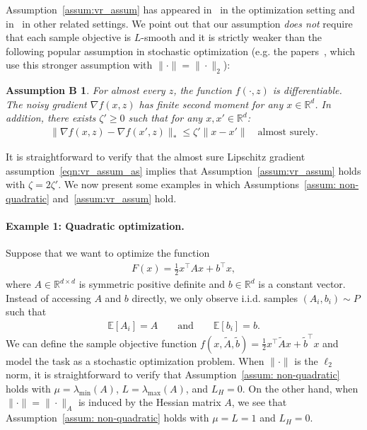\documentclass[11pt,twoside]{article}
\numberwithin{equation}{section}
\newcommand{\EE}{\mathbb{E}}
\newcommand{\RR}{\mathbb{R}}
\newcommand{\1}{\mathbf{1}}
\theoremstyle{remark}
\theoremstyle{plain}
\newtheorem*{assumptionBprime}{\textbf{Assumption B\textquotesingle}}
\newcommand{\liph}{L_H}
\begin{document}
Assumption~\ref{assum:vr_assum} has appeared in~\cite{li2022root} in the optimization setting and in~\cite{mou2023optimal,li2023accelerated} in other related settings. We point out that our assumption \emph{does not} require that each sample objective is $L$-smooth and it is strictly weaker than the following popular assumption in stochastic optimization (e.g. the papers~\cite{moulines2011non, needell2014stochastic, frostig2015competing, nguyen2019new,khamaru2024stochastic}, which use this stronger assumption with $\| \cdot \| = \| \cdot \|_2$):
\begin{assumptionBprime}\label{assum:vr_assum_standard} 
	For almost every $z$, the function $f(\cdot, z)$ is differentiable.   The noisy gradient $\nabla f(x,z)$ has finite second moment for any $x \in \RR^d$.  In addition, there exists $\zeta' \ge 0$ such that 
	for any $x, x' \in \RR^d$:
	\begin{align}\label{eqn:vr_assum_as}
		\|\nabla f(x,z)  -\nabla f(x',z)\|_* \le \zeta' \|x - x'\| \quad \text{almost surely.}
	\end{align} 
\end{assumptionBprime}
It is straightforward to verify that the almost sure Lipschitz gradient assumption~\eqref{eqn:vr_assum_as} implies that Assumption~\ref{assum:vr_assum} holds with $\zeta = 2\zeta'$. 
We now present some examples in which Assumptions~\ref{assum: non-quadratic} and~\ref{assum:vr_assum} hold.


\paragraph{Example 1: Quadratic optimization.}
Suppose that we want to optimize the function 
\begin{align*}
	F(x) = \frac{1}{2} x^\top A x + b^\top x,
\end{align*}
where $A \in \RR^{d\times d}$ is symmetric positive definite and $b \in \RR^d$ is a constant vector. Instead of accessing $A$ and $b$ directly, we only observe i.i.d. samples $(A_i, b_i) \sim P$ such that 
\begin{align*}
	\EE[A_i] = A \qquad \text{and} \qquad \EE[b_i] = b.
\end{align*}
We can define the sample objective function $f(x,\tilde A,\tilde b) = \frac{1}{2} x^\top \tilde A x + \tilde b^\top x$ and model the task as a stochastic optimization problem. When $\|\cdot\|$ is the $\ell_2$ norm, 
it is straightforward to verify that Assumption~\ref{assum: non-quadratic} holds with $\mu = \lambda_{\min}(A)$, $L = \lambda_{\max}(A)$, and $\liph = 0$. On the other hand, when $\|\cdot\| = \| \cdot \|_A$ is induced by the Hessian matrix $A$, we see that Assumption~\ref{assum: non-quadratic} holds with $\mu =L = 1$ and $\liph = 0$.
\end{document}

